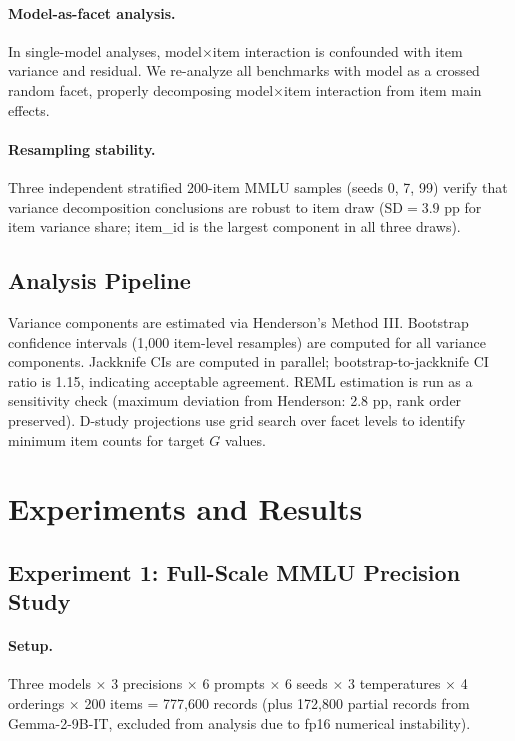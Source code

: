 \documentclass[letterpaper,11pt]{article}
\begin{document}
\paragraph{Model-as-facet analysis.}
In single-model analyses, model$\times$item interaction is confounded with item variance and residual.
We re-analyze all benchmarks with model as a crossed random facet, properly decomposing model$\times$item interaction from item main effects.

\paragraph{Resampling stability.}
Three independent stratified 200-item MMLU samples (seeds 0, 7, 99) verify that variance decomposition conclusions are robust to item draw ($\text{SD} = 3.9$ pp for item variance share; item\_id is the largest component in all three draws).

\subsection{Analysis Pipeline}

Variance components are estimated via Henderson's Method III.
Bootstrap confidence intervals (1{,}000 item-level resamples) are computed for all variance components.
Jackknife CIs are computed in parallel; bootstrap-to-jackknife CI ratio is 1.15, indicating acceptable agreement.
REML estimation is run as a sensitivity check (maximum deviation from Henderson: 2.8 pp, rank order preserved).
D-study projections use grid search over facet levels to identify minimum item counts for target $G$ values.

\section{Experiments and Results}

\subsection{Experiment 1: Full-Scale MMLU Precision Study}
\label{sec:exp1}

\paragraph{Setup.}
Three models $\times$ 3 precisions $\times$ 6 prompts $\times$ 6 seeds $\times$ 3 temperatures $\times$ 4 orderings $\times$ 200 items = 777{,}600 records (plus 172{,}800 partial records from Gemma-2-9B-IT, excluded from analysis due to fp16 numerical instability).
\end{document}
